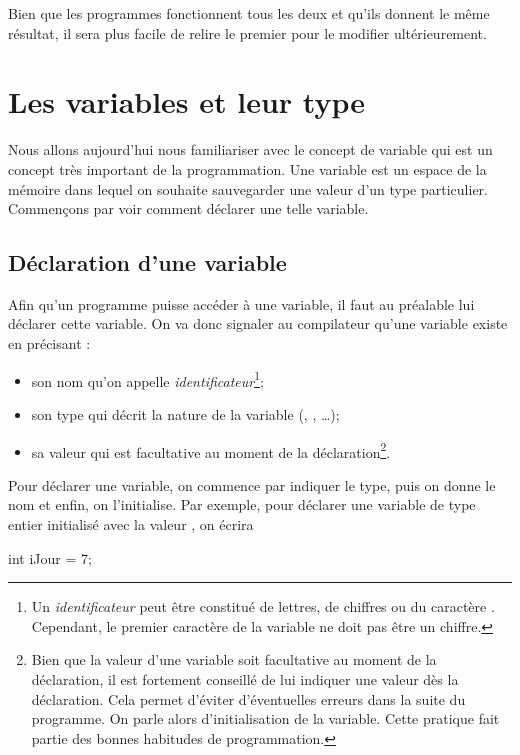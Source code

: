 \documentclass[a4paper]{article}
\begin{document}
			Bien que les programmes fonctionnent tous les deux et qu'ils donnent le même résultat, il sera plus facile de relire le premier pour le modifier ultérieurement.

	\section{Les variables et leur type}
		Nous allons aujourd'hui nous familiariser avec le concept de variable qui est un concept très important de la programmation.
		Une variable est un espace de la mémoire dans lequel on souhaite sauvegarder une valeur d'un type particulier.
		Commençons par voir comment déclarer une telle variable.
		\subsection{Déclaration d'une variable}
			Afin qu'un programme  puisse accéder à une variable, il faut au préalable lui déclarer cette variable.
			On va donc signaler au compilateur qu'une variable existe en précisant :
			\begin{itemize}
				\item son nom qu'on appelle \emph{identificateur}\footnote{Un \emph{identificateur} peut être constitué de lettres, de chiffres ou du caractère .
			Cependant, le premier caractère de la variable ne doit pas être un chiffre.};
				\item son type qui décrit la nature de la variable (, , \dots{});
				\item sa valeur qui est facultative au moment de la déclaration\footnote{Bien que la valeur d'une variable soit facultative au moment de la déclaration, il est fortement conseillé de lui indiquer une valeur dès la déclaration.
				Cela permet d'éviter d'éventuelles erreurs dans la suite du programme.
				On parle alors d'initialisation de la variable.
				Cette pratique fait partie des bonnes habitudes de programmation.}.
			\end{itemize}

			Pour déclarer une variable, on commence par indiquer le type, puis on donne le nom et enfin, on l'initialise.
			Par exemple, pour déclarer une variable  de type entier initialisé avec la valeur , on écrira
			\begin{Code*}
int iJour = 7;
			\end{Code*}
\end{document}
